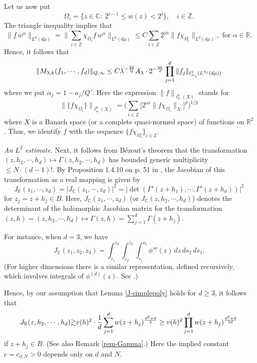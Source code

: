 \documentclass[11 pt]{amsart}
\theoremstyle{plain}
\numberwithin{equation}{section}
\theoremstyle{plain}
\numberwithin{equation}{section}
\theoremstyle{remark}
\begin{document}
Let us now put
$$ \Omega_i = \{ z\in {{\mathbb {C}}}: ~ 2^{i-1} \le w (z) < 2^i \}, \quad i\in {{\mathbb {Z}}} . $$
The triangle inequality implies that
\[ \|f \, w^{\alpha} \|_{L^{p}(d\mu )} = \|\sum_{i\in
{{\mathbb {Z}}}} \chi_{\Omega_i} f \, w^{\alpha} \|_{L^{p}(d\mu )} \le C
\sum_{i\in {{\mathbb {Z}}}} 2^{i \alpha} \|f \chi_{\Omega_i} \|_{L^{p}(d\mu
)} , \text{  for  } \alpha \in {{\mathbb {R}}} .\]
Hence, it follows that
\begin{equation}\label{asymm}
\| M_{{\lambda}, k} (f_1, \cdots, f_d)\|_{Q,\infty} \le C {\lambda}^{-{2d\over Q}} A_{\lambda}
\cdot 2^{-{4k\over d}}  \prod_{j=1}^d \| f_j \|_{\ell^1_{\alpha_j}
(L^{q_j}(d\mu ))}
\end{equation}
where we put $\alpha_j = 1 - a_j/Q'$. Here the expression $\|
f\|_{\ell^p_{\alpha} (X)}$ stands for
$$ \| \{f \chi_{\Omega_i}\}\|_{\ell^p_{\alpha} (X)} =
\Big(\sum_{i\in {{\mathbb {Z}}}} \big[ 2^{\alpha i} \| f
\chi_{\Omega_i}\|_{X} \big]^p \Big)^{1/p}  $$
where $X$ is a Banach space (or a complete quasi-normed space) of functions
on ${{\mathbb {R}}}^2$. Thus, we identify $f$ with the sequence $\{f
\chi_{\Omega_i}\}_{i\in {{\mathbb {Z}}}}$.

\medskip

{\sl An $L^2$ estimate.}
Next, it follows from B\'ezout's theorem
that the transformation $(z,h_2, \cdots, h_d) \mapsto \Gamma(z, h_2,\cdots, h_d)$ has bounded generic multiplicity $\le N \cdot (d-1)!$.
By Proposition 1.4.10 on p. 51 in \cite{Kr}, the Jacobian of this
transformation as a real mapping is given by
$$ J_{{\mathbb {R}}} (z_1, \cdots, z_d)= |J_{{\mathbb {C}}} (z_1, \cdots, z_d)|^2
= |\det(\Gamma'(z+h_1), \cdots, \Gamma'(z+h_d))|^2 $$
for $z_j = z+h_j \in B$.
Here, $J_{{\mathbb {C}}} (z_1, \cdots, z_d)$ (or $J_{{\mathbb {C}}} (z, h_2,\cdots, h_d)$) denotes the determinant of the holomorphic Jacobian matrix for
the transformation $(z,h) = (z,h_2,\cdots, h_d) \mapsto \Gamma(z, h) = \sum_{j=1}^d \Gamma(z+h_j)$.

For instance, when $d=3$, we have
\begin{equation}\label{phi-rep}
 J_{{\mathbb {C}}} (z_1, z_2, z_3) = \int_{z_1}^{z_2} \int_{z_2}^{z_3} \int_{s_1}^{s_2} \phi'''(z) \, dz\, ds_2 \,ds_1 .
\end{equation}
(For higher dimensions there is a similar representation, defined recursively, which involves integrals of $\phi^{(d)}(z)$. See \cite{BOS2, DeW, DeFW}.)

Hence, by our assumption that Lemma \ref{J-simplepoly} holds for $d\ge 3$, it follows that
\begin{align}\label{Jacobian-a}
J_{{\mathbb {R}}} (z, h_2,\cdots, h_d) {\gtrsim} v(h)^2 \cdot {1\over d}\sum_{j=1}^d w(z+ h_j)^{d^2+d \over 2} \ge v(h)^2 \prod_{j=1}^d w(z+ h_j)^{d^2+d \over 2d}
\end{align}
if $z+ h_j \in B$. (See also Remark \ref{rem-Gamma}.)
Here the implied constant $c = c_{d,N} >0$ depends only on $d$ and $N$.
\end{document}
